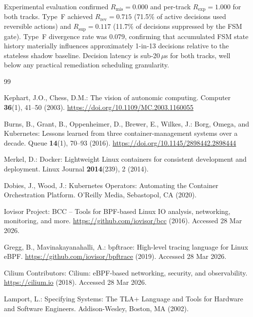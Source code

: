 \documentclass[runningheads]{llncs}
\begin{document}
Experimental evaluation confirmed $R_\text{mis} = 0.000$ and
per-track $R_\text{exp} = 1.000$ for both tracks.  Type~F achieved
$R_\text{rev} = 0.715$ (71.5\% of active decisions used reversible
actions) and $R_\text{sup} = 0.117$ (11.7\% of decisions suppressed
by the FSM gate).  Type~F divergence rate was 0.079, confirming that
accumulated FSM state history materially influences approximately
1-in-13 decisions relative to the stateless shadow baseline.
Decision latency is sub-20\,$\mu$s for both tracks, well below any
practical remediation scheduling granularity.


\begin{thebibliography}{99}

Kephart, J.O., Chess, D.M.:
The vision of autonomic computing.
Computer \textbf{36}(1), 41--50 (2003).
\url{https://doi.org/10.1109/MC.2003.1160055}

Burns, B., Grant, B., Oppenheimer, D., Brewer, E., Wilkes, J.:
Borg, Omega, and Kubernetes: Lessons learned from three container-management systems over a decade.
Queue \textbf{14}(1), 70--93 (2016).
\url{https://doi.org/10.1145/2898442.2898444}

Merkel, D.:
Docker: Lightweight Linux containers for consistent development and deployment.
Linux Journal \textbf{2014}(239), 2 (2014).

Dobies, J., Wood, J.:
Kubernetes Operators: Automating the Container Orchestration Platform.
O'Reilly Media, Sebastopol, CA (2020).

Iovisor Project:
BCC -- Tools for BPF-based Linux IO analysis, networking, monitoring, and more.
\url{https://github.com/iovisor/bcc} (2016).
Accessed 28 Mar 2026.

Gregg, B., Mavinakayanahalli, A.:
bpftrace: High-level tracing language for Linux eBPF.
\url{https://github.com/iovisor/bpftrace} (2019).
Accessed 28 Mar 2026.

Cilium Contributors:
Cilium: eBPF-based networking, security, and observability.
\url{https://cilium.io} (2018).
Accessed 28 Mar 2026.

Lamport, L.:
Specifying Systems: The TLA+ Language and Tools for Hardware and Software Engineers.
Addison-Wesley, Boston, MA (2002).


\end{thebibliography}
\end{document}

